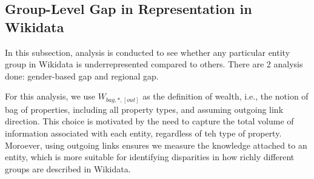 \subsection{Group-Level Gap in Representation in Wikidata}

In this subsection, analysis is conducted to see whether any particular entity group in Wikidata is underrepresented compared to others. There are 2 analysis done: gender-based gap and regional gap.

For this analysis, we use $W_{bag,*,[out]}$ as the definition of wealth, i.e., the notion of bag of properties, including all property types, and assuming outgoing link direction. This choice is motivated by the need to capture the total volume of information associated with each entity, regardless of teh type of property. Moroever, using outgoing links ensures we measure the knowledge attached to an entity, which is more suitable for identifying disparities in how richly different groups are described in Wikidata.




